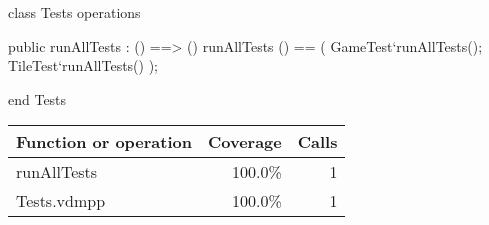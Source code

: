 \begin{vdm_al}
class Tests
  operations

  public runAllTests : () ==> ()
  runAllTests () == (
    GameTest`runAllTests();
    TileTest`runAllTests()
  );

end Tests
\end{vdm_al}
\bigskip
\begin{longtable}{|l|r|r|}
\hline
Function or operation & Coverage & Calls \\
\hline
\hline
runAllTests & 100.0\% & 1 \\
\hline
\hline
Tests.vdmpp & 100.0\% & 1 \\
\hline
\end{longtable}

